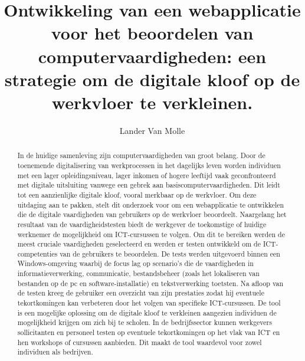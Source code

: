 \documentclass{hogent-article}
\title{Ontwikkeling van een webapplicatie voor het beoordelen van computervaardigheden: een strategie om de digitale kloof op de werkvloer te verkleinen.}
\author{Lander {Van Molle}}
\begin{document}
\begin{abstract}
  In de huidige samenleving zijn computervaardigheden van groot belang. Door de toenemende digitalisering van werkprocessen in het dagelijks leven worden individuen met een lager opleidingsniveau, lager inkomen of hogere leeftijd vaak geconfronteerd met digitale uitsluiting vanwege een gebrek aan basiscomputervaardigheden. Dit leidt tot een aanzienlijke digitale kloof, vooral merkbaar op de werkvloer. Om deze uitdaging aan te pakken, stelt dit onderzoek voor om een webapplicatie te ontwikkelen die de digitale vaardigheden van gebruikers op de werkvloer beoordeelt. Naargelang het resultaat van de vaardigheidstesten biedt de werkgever de toekomstige of huidige werknemer de mogelijkheid om ICT-cursussen te volgen. Om dit te bereiken werden de meest cruciale vaardigheden geselecteerd en werden er testen ontwikkeld om de ICT-competenties van de gebruikers te beoordelen. De tests werden uitgevoerd binnen een Windows-omgeving waarbij de focus lag op scenario's die de vaardigheden in informatieverwerking, communicatie, bestandsbeheer (zoals het lokaliseren van bestanden op de pc en software-installatie) en tekstverwerking toetsten. Na afloop van de testen kreeg de gebruiker een overzicht van zijn prestaties zodat hij eventuele tekortkomingen kan verbeteren door het volgen van specifieke ICT-cursussen. De tool is een mogelijke oplossing om de digitale kloof te verkleinen aangezien individuen de mogelijkheid krijgen om zich bij te scholen. In de bedrijfssector kunnen werkgevers sollicitanten en personeel testen op eventuele tekortkomingen op het vlak van ICT en hen workshops of cursussen aanbieden. Dit maakt de tool waardevol voor zowel individuen als bedrijven.
\end{abstract}

\tableofcontents



\printbibliography[heading=bibintoc]
\end{document}
